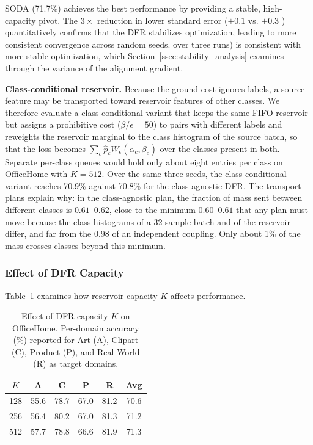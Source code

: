 \documentclass[preprint,12pt]{elsarticle}
\providecommand{\DIFadd}[1]{{\protect\color{blue} \sf #1}} %
\providecommand{\DIFdel}[1]{{\protect\color{red} \scriptsize #1}} %
\providecommand{\DIFaddbegin}{} %
\providecommand{\DIFaddend}{} %
\providecommand{\DIFdelbegin}{} %
\providecommand{\DIFdelend}{} %
\newcommand{\DIFscaledelfig}{0.5}
\newlength{\DIFdelgraphicswidth} %
\newlength{\DIFdelgraphicsheight} %
\newcommand{\DIFaddincludegraphics}[2][]{{\color{blue}\fbox{\DIFOincludegraphics[#1]{#2}}}} %
\newcommand{\DIFdelincludegraphics}[2][]{%
\sbox{\DIFdelgraphicsbox}{\DIFOincludegraphics[#1]{#2}}%
\settoboxwidth{\DIFdelgraphicswidth}{\DIFdelgraphicsbox} %
\settoboxtotalheight{\DIFdelgraphicsheight}{\DIFdelgraphicsbox} %
\scalebox{\DIFscaledelfig}{%
\parbox[b]{\DIFdelgraphicswidth}{\usebox{\DIFdelgraphicsbox}\\[-\baselineskip] \rule{\DIFdelgraphicswidth}{0em}}\llap{\resizebox{\DIFdelgraphicswidth}{\DIFdelgraphicsheight}{%
\setlength{\unitlength}{\DIFdelgraphicswidth}%
\begin{picture}(1,1)%
\thicklines\linethickness{2pt} %
{\color[rgb]{1,0,0}\put(0,0){\framebox(1,1){}}}%
{\color[rgb]{1,0,0}\put(0,0){\line( 1,1){1}}}%
{\color[rgb]{1,0,0}\put(0,1){\line(1,-1){1}}}%
\end{picture}%
}\hspace*{3pt}}} %
} %
\DeclareRobustCommand{\DIFaddbegin}{\DIFOaddbegin \let\includegraphics\DIFaddincludegraphics} %
\DeclareRobustCommand{\DIFaddend}{\DIFOaddend \let\includegraphics\DIFOincludegraphics} %
\DeclareRobustCommand{\DIFdelbegin}{\DIFOdelbegin \let\includegraphics\DIFdelincludegraphics} %
\DeclareRobustCommand{\DIFdelend}{\DIFOaddend \let\includegraphics\DIFOincludegraphics} %
\begin{document}
SODA (71.7\%) achieves the best performance by providing a stable, high-capacity pivot. The \DIFdelbegin \DIFdel{$3\times$ reduction in }\DIFdelend \DIFaddbegin \DIFadd{lower }\DIFaddend standard error ($\pm 0.1$ vs. $\pm 0.3$ \DIFdelbegin \DIFdel{) quantitatively confirms that the DFR stabilizes optimization, leading to more consistent convergence across random seeds. }\DIFdelend \DIFaddbegin \DIFadd{over three runs) is consistent with more stable optimization, which Section~\ref{ssec:stability_analysis} examines through the variance of the alignment gradient.
}\DIFaddend 

\DIFaddbegin \DIFadd{\textbf{Class-conditional reservoir.} Because the ground cost ignores labels, a source feature may be transported toward reservoir features of other classes. We therefore evaluate a class-conditional variant that keeps the same FIFO reservoir but assigns a prohibitive cost ($\beta/\epsilon=50$) to pairs with different labels and reweights the reservoir marginal to the class histogram of the source batch, so that the loss becomes $\sum_c \hat p_c W_\epsilon(\alpha_c,\beta_c)$ over the classes present in both. Separate per-class queues would hold only about eight entries per class on OfficeHome with $K=512$. Over the same three seeds, the class-conditional variant reaches 70.9\% against 70.8\% for the class-agnostic DFR. The transport plans explain why: in the class-agnostic plan, the fraction of mass sent between different classes is $0.61$--$0.62$, close to the minimum $0.60$--$0.61$ that any plan must move because the class histograms of a 32-sample batch and of the reservoir differ, and far from the $0.98$ of an independent coupling. Only about 1\% of the mass crosses classes beyond this minimum.
}

\DIFaddend \subsubsection{Effect of DFR Capacity}

Table~\ref{tab:ablation_dfr_k} examines how reservoir capacity $K$ affects performance.

\begin{table}[t]
\caption{Effect of DFR capacity $K$ on OfficeHome. Per-domain accuracy (\%) reported for Art (A), Clipart (C), Product (P), and Real-World (R) as target domains.}
\label{tab:ablation_dfr_k}
\centering
\small
\renewcommand{\arraystretch}{1.1}
\begin{tabular}{ccccc|c}
\toprule
\textbf{$K$} & \textbf{A} & \textbf{C} & \textbf{P} & \textbf{R} & \textbf{Avg} \\
\midrule
128 & 55.6 & 78.7 & 67.0 & 81.2 & 70.6 \\
256 & 56.4 & 80.2 & 67.0 & 81.3 & 71.2 \\
512 & 57.7 & 78.8 & 66.6 & 81.9 & 71.3 \\
\bottomrule
\end{tabular}
\end{table}
\end{document}
